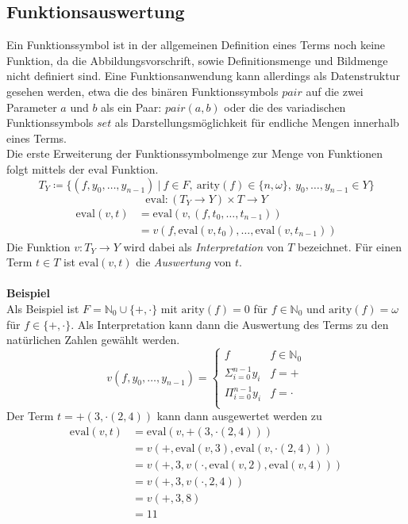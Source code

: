 \documentclass{article}
\begin{document}
\subsection{Funktionsauswertung}
Ein Funktionssymbol ist in der allgemeinen Definition eines Terms noch keine Funktion, da die Abbildungsvorschrift, sowie Definitionsmenge und Bildmenge nicht definiert sind. Eine Funktionsanwendung kann allerdings als Datenstruktur gesehen werden, etwa die des binären Funktionssymbols $pair$ auf die zwei Parameter $a$ und $b$ als ein Paar: $pair(a, b)$ oder die des variadischen Funktionssymbols $set$ als Darstellungsmöglichkeit für endliche Mengen innerhalb eines Terms.\\
Die erste Erweiterung der Funktionssymbolmenge zur Menge von Funktionen folgt mittels der $\mathrm{eval}$ Funktion.
$$T_Y \coloneqq \{(f, y_0, \dots, y_{n-1})~|~f \in F,~\mathrm{arity}(f) \in \{n, \omega\},
~ y_0, \dots,y_{n-1} \in Y\}$$
$$\mathrm{eval} \colon (T_Y \rightarrow Y) \times T \rightarrow Y$$
\begin{equation*}
	\begin{split}
	\mathrm{eval}(v, t) &= \mathrm{eval}(v, (f, t_0, \dots , t_{n-1})) \\
	&= v(f, \mathrm{eval}(v, t_0), \dots, \mathrm{eval}(v, t_{n-1}))
	\end{split}
\end{equation*}
Die Funktion $v \colon T_Y \rightarrow Y$ wird dabei als \textit{Interpretation} von $T$ bezeichnet. Für einen Term $t \in T$ ist $\mathrm{eval}(v, t)$ die \textit{Auswertung} von $t$.
\\~\\

\textbf{Beispiel}\\
Als Beispiel ist $F = \mathbb{N}_0 \cup \{+, \cdot \}$ mit $\mathrm{arity}(f) = 0$ für $f\in \mathbb{N}_0$ und $\mathrm{arity}(f) = \omega$ für $f\in \{+, \cdot \}$.
Als Interpretation kann dann die Auswertung des Terms zu den natürlichen Zahlen gewählt werden.
$$v(f, y_0, \dots, y_{n-1}) = \begin{cases}
f & f \in \mathbb{N}_0\\
\Sigma_{i = 0}^{n-1} y_i & f = +\\
\Pi_{i = 0}^{n-1} y_i & f = \cdot\\
\end{cases}$$
Der Term $t = +(3, \cdot(2, 4))$ kann dann ausgewertet werden zu 
\begin{equation*}
    \begin{split}
    \mathrm{eval}(v, t) &= \mathrm{eval}(v, +(3, \cdot(2, 4))) \\
    &= v(+, \mathrm{eval}(v, 3), \mathrm{eval}(v, \cdot(2, 4))) \\
    &= v(+, 3, v(\cdot, \mathrm{eval}(v, 2), \mathrm{eval}(v, 4))) \\
    &= v(+, 3, v(\cdot, 2, 4)) \\
    &= v(+, 3, 8) \\
    &= 11 \\
    \end{split}
\end{equation*}
\end{document}
